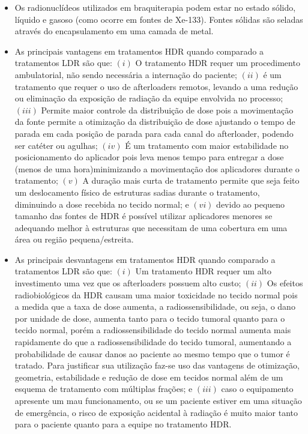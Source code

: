 \documentclass[11pt,a4paper]{article}
\newcounter{exemplo}
\begin{document}
\begin{exemplo}[8. Braquiterapia]
\begin{itemize}
        \item Os radionuclídeos utilizados em braquiterapia podem estar no estado sólido, líquido e gasoso (como ocorre em fontes de Xe-133). Fontes sólidas são seladas através do encapsulamento em uma camada de metal.
        
        \item As principais vantagens em tratamentos HDR quando comparado a tratamentos LDR são que: $(i)$ O tratamento HDR requer um procedimento ambulatorial, não sendo necessária a internação do paciente; $(ii)$ é um tratamento que requer o uso de afterloaders remotos, levando a uma redução ou eliminação da exposição de radiação da equipe envolvida no processo; $(iii)$ Permite maior controle da distribuição de dose pois a movimentação da fonte permite a otimização da distribuição de dose ajustando o tempo de parada em cada posição de parada para cada canal do afterloader, podendo ser catéter ou agulhas; $(iv)$ É um tratamento com maior estabilidade no posicionamento do aplicador pois leva menos tempo para entregar a dose (menos de uma hora)minimizando a movimentação dos aplicadores durante o tratamento;  $(v)$ A duração mais curta de tratamento permite que seja feito um deslocamento físico de estruturas sadias durante o tratamento, diminuindo a dose recebida no tecido normal; e $(vi)$ devido ao pequeno tamanho das fontes de HDR é possível utilizar aplicadores menores se adequando melhor à estruturas que necessitam de uma cobertura em uma área ou região pequena/estreita.
        

        \item As principais desvantagens em tratamentos HDR quando comparado a tratamentos LDR são que: $(i)$ Um tratamento HDR requer um alto investimento uma vez que os afterloaders possuem alto custo; $(ii)$ Os efeitos radiobiológicos da HDR causam uma maior toxicidade no tecido normal pois a medida que a taxa de dose aumenta, a radiossensibilidade, ou seja, o dano por unidade de dose, aumenta tanto para o tecido tumoral quanto para o tecido normal, porém a radiossensibilidade do tecido normal aumenta mais rapidamente do que a radiossensibilidade do tecido tumoral, aumentando a probabilidade de causar danos ao paciente ao mesmo tempo que o tumor é tratado. Para justificar sua utilização faz-se uso das vantagens de otimização, geometria, estabilidade e redução de dose em tecidos normal além de um esquema de tratamento com múltiplas frações; e $(iii)$ caso o equipamento apresente um mau funcionamento, ou se um paciente estiver em uma situação de emergência, o risco de exposição acidental à radiação é muito maior tanto para o paciente quanto para a equipe no tratamento HDR.
        

\end{itemize}
\end{exemplo}
\end{document}
